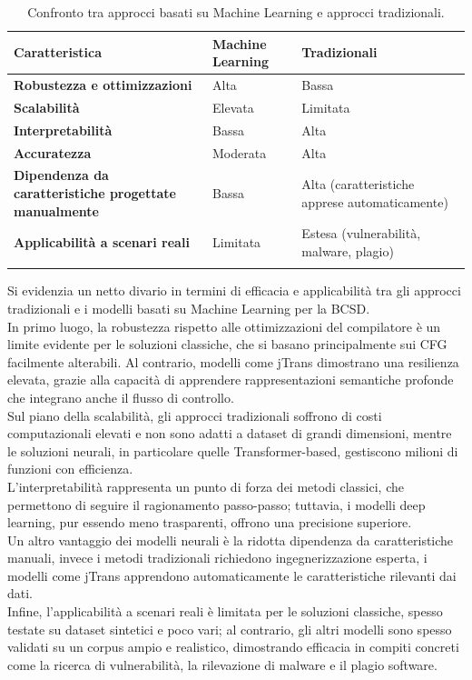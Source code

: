 \documentclass[12pt,a4paper,openright,twoside]{report}
\begin{document}
\renewcommand{\arraystretch}{1.3}
\begin{longtable}{|p{5cm}|p{4cm}|p{4cm}|}
\hline
\textbf{Caratteristica} & \textbf{Machine Learning \cite{UnsuperBinTrans} \cite{jTrans} \cite{Zeek}} & \textbf{Tradizionali \cite{statisticalsob} \cite{crossArchBugSearch}} \\
\hline
\endfirsthead
\textbf{Robustezza e ottimizzazioni} & Alta & Bassa \\
\hline
\textbf{Scalabilità} & Elevata & Limitata \\
\hline
\textbf{Interpretabilità} & Bassa & Alta \\
\hline
\textbf{Accuratezza} & Moderata & Alta \\
\hline
\textbf{Dipendenza da caratteristiche progettate manualmente} & Bassa & Alta (caratteristiche apprese automaticamente) \\
\hline
\textbf{Applicabilità a scenari reali} & Limitata & Estesa (vulnerabilità, malware, plagio)\\
\hline
\caption{Confronto tra approcci basati su Machine Learning e approcci tradizionali.}

\label{confrontoFinale}
\end{longtable}

Si evidenzia un netto divario in termini di efficacia e applicabilità tra gli approcci tradizionali e i modelli basati su Machine Learning per la BCSD.\\
In primo luogo, la robustezza rispetto alle ottimizzazioni del compilatore è un limite evidente per le soluzioni classiche, che si basano principalmente sui CFG facilmente alterabili. Al contrario, modelli come jTrans dimostrano una resilienza elevata, grazie alla capacità di apprendere rappresentazioni semantiche profonde che integrano anche il flusso di controllo.\\
Sul piano della scalabilità, gli approcci tradizionali soffrono di costi computazionali elevati e non sono adatti a dataset di grandi dimensioni, mentre le soluzioni neurali, in particolare quelle Transformer-based, gestiscono milioni di funzioni con efficienza.\\ L’interpretabilità rappresenta un punto di forza dei metodi classici, che permettono di seguire il ragionamento passo-passo; tuttavia, i modelli deep learning, pur essendo meno trasparenti, offrono una precisione superiore.\\
Un altro vantaggio dei modelli neurali è la ridotta dipendenza da caratteristiche manuali, invece i metodi tradizionali richiedono ingegnerizzazione esperta, i modelli come jTrans apprendono automaticamente le caratteristiche rilevanti dai dati.\\
Infine, l’applicabilità a scenari reali è limitata per le soluzioni classiche, spesso testate su dataset sintetici e poco vari; al contrario, gli altri modelli sono spesso validati su un corpus ampio e realistico, dimostrando efficacia in compiti concreti come la ricerca di vulnerabilità, la rilevazione di malware e il plagio software.
\end{document}
